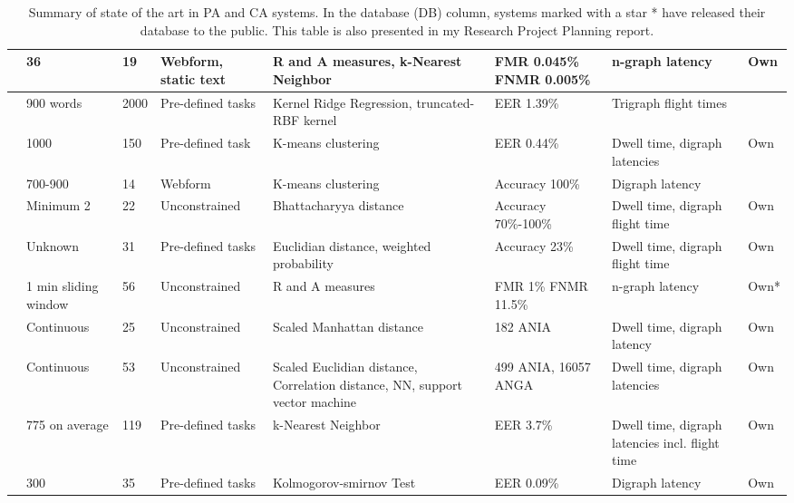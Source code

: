 \documentclass[informationsecurity]{gucmasterproject}
\begin{document}
\begin{table}[h]
{\begin{tabular}{ |l|p{2.1cm}|l|p{2.15cm}|p{3cm}|p{2.3cm}|p{2.5cm}|l| }
 \cite{hu} & 36 & 19 & Webform, static text & R and A measures, k-Nearest Neighbor & FMR 0.045\% FNMR 0.005\% & n-graph latency & Own \\ \hline
 \cite{900words} & 900 words & 2000 & Pre-defined tasks & Kernel Ridge Regression, truncated-RBF kernel & EER 1.39\% & Trigraph flight times & \cite{chang} \\ \hline
 \cite{KIM2017} & 1000 & 150 & Pre-defined task & K-means clustering & EER 0.44\% & Dwell time, digraph latencies & Own \\ \hline
 \cite{Solami} & 700-900 & 14 & Webform & K-means clustering & Accuracy 100\% & Digraph latency & \cite{gnp}\\ \hline
 \cite{Janakiraman2007} & Minimum 2 & 22 & Unconstrained & Bhattacharyya distance & Accuracy 70\%-100\% & Dwell time, digraph flight time & Own\\ \hline
 \cite{Monrose} & Unknown & 31 & Pre-defined tasks & Euclidian distance, weighted probability & Accuracy 23\% & Dwell time, digraph flight time & Own\\ \hline
 \cite{sliding} & 1 min sliding window & 56 & Unconstrained & R and A measures & FMR 1\% FNMR 11.5\% & n-graph latency & Own*\\ \hline
 \cite{BOURS201236} & Continuous & 25 & Unconstrained & Scaled Manhattan distance & 182 ANIA & Dwell time, digraph latency & Own\\ \hline
 \cite{mondal} & Continuous & 53 & Unconstrained & Scaled Euclidian distance, Correlation distance, NN, support vector machine & 499 ANIA, 16057 ANGA & Dwell time, digraph latencies & Own \\ \hline
 \cite{monaco} & 775 on average & 119 & Pre-defined tasks & k-Nearest Neighbor & EER 3.7\% & Dwell time, digraph latencies incl. flight time & Own \\ \hline
 \cite{park} & 300 & 35 & Pre-defined tasks & Kolmogorov-smirnov Test & EER 0.09\% & Digraph latency & Own \\ \hline

\end{tabular}
}
\caption{Summary of state of the art in PA and CA systems. In the database (DB) column, systems marked with a star * have released their database to the public. This table is also presented in my Research Project Planning report.}
\label{tab:state}
\end{table}
\end{document}
